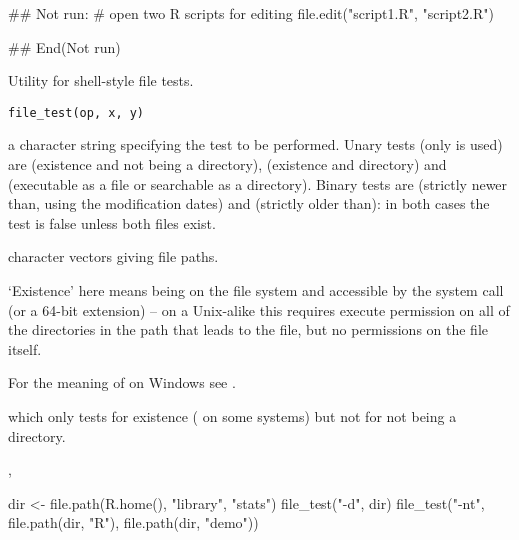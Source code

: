 %
\begin{Examples}
\begin{ExampleCode}
## Not run: 
# open two R scripts for editing
file.edit("script1.R", "script2.R")

## End(Not run)
\end{ExampleCode}
\end{Examples}
%
\begin{Description}\relax
Utility for shell-style file tests.
\end{Description}
%
\begin{Usage}
\begin{verbatim}
file_test(op, x, y)
\end{verbatim}
\end{Usage}
%
\begin{Arguments}
\begin{ldescription}
\item[\code{op}] a character string specifying the test to be performed.
Unary tests (only  is used) are  (existence and
not being a directory),  (existence and directory) and
 (executable as a file or searchable as a directory). 
Binary tests are  (strictly newer than, using the modification
dates) and  (strictly older than): in both cases the
test is false unless both files exist.
\item[\code{x,y}] character vectors giving file paths.
\end{ldescription}
\end{Arguments}
%
\begin{Details}\relax
`Existence' here means being on the file system and accessible
by the  system call (or a 64-bit extension) -- on a
Unix-alike this requires execute permission on all of the directories in
the path that leads to the file, but no permissions on the file
itself.

For the meaning of  on Windows see .
\end{Details}
%
\begin{SeeAlso}\relax
{} which only tests for existence
( on some systems) but not for not being a directory.

, 
\end{SeeAlso}
%
\begin{Examples}
\begin{ExampleCode}
dir <- file.path(R.home(), "library", "stats")
file_test("-d", dir)
file_test("-nt", file.path(dir, "R"), file.path(dir, "demo"))
\end{ExampleCode}
\end{Examples}
